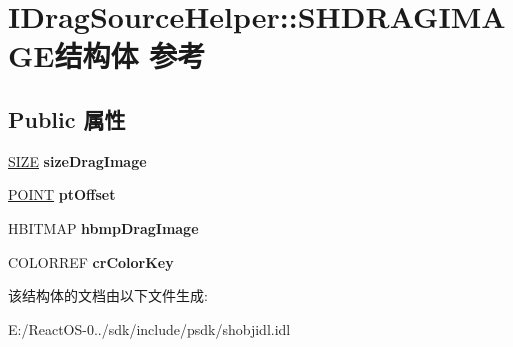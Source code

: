 \hypertarget{struct_i_drag_source_helper_1_1_s_h_d_r_a_g_i_m_a_g_e}{}\section{I\+Drag\+Source\+Helper\+:\+:S\+H\+D\+R\+A\+G\+I\+M\+A\+G\+E结构体 参考}
\label{struct_i_drag_source_helper_1_1_s_h_d_r_a_g_i_m_a_g_e}
\subsection*{Public 属性}
\begin{DoxyCompactItemize}
\item 
\mbox{\label{struct_i_drag_source_helper_1_1_s_h_d_r_a_g_i_m_a_g_e_afae78e1422064c7279b0cd7ce7f10259}} 
\hyperlink{structtag_s_i_z_e}{S\+I\+ZE} {\bfseries size\+Drag\+Image}
\item 
\mbox{\label{struct_i_drag_source_helper_1_1_s_h_d_r_a_g_i_m_a_g_e_a9ddab420976e3d1c4fd0248b8cedd8bc}} 
\hyperlink{structtag_p_o_i_n_t}{P\+O\+I\+NT} {\bfseries pt\+Offset}
\item 
\mbox{\label{struct_i_drag_source_helper_1_1_s_h_d_r_a_g_i_m_a_g_e_a518cc7afd58accf7e1db0f7bbd97719a}} 
H\+B\+I\+T\+M\+AP {\bfseries hbmp\+Drag\+Image}
\item 
\mbox{\label{struct_i_drag_source_helper_1_1_s_h_d_r_a_g_i_m_a_g_e_a2449cd8af394a7de19294f98154fea34}} 
C\+O\+L\+O\+R\+R\+EF {\bfseries cr\+Color\+Key}
\end{DoxyCompactItemize}


该结构体的文档由以下文件生成\+:\begin{DoxyCompactItemize}
\item 
E\+:/\+React\+O\+S-\/0../sdk/include/psdk/shobjidl.\+idl\end{DoxyCompactItemize}
